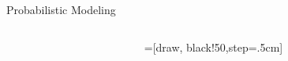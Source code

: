 \begin{frame}{Probabilistic Modeling}
\begin{columns}
\begin{column}{0.48\textwidth}
        
    \end{column}
    \begin{column}{0.48\textwidth}
        =[draw, black!50,step=.5cm]
    \end{column}
\end{columns}



\end{frame}